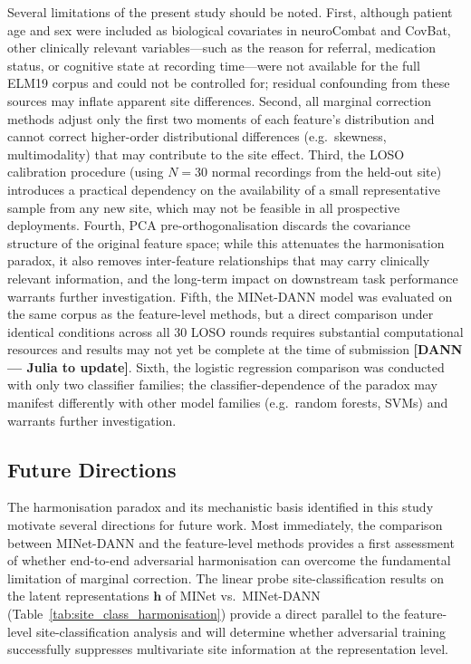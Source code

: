 \documentclass[preprint,12pt]{elsarticle}
\begin{document}
Several limitations of the present study should be noted.
First, although patient age and sex were included as biological
covariates in neuroCombat and CovBat, other clinically relevant
variables---such as the reason for referral, medication status, or
cognitive state at recording time---were not available for the full
ELM19 corpus and could not be controlled for; residual confounding
from these sources may inflate apparent site differences.
Second, all marginal correction methods adjust only the first two
moments of each feature's distribution and cannot correct
higher-order distributional differences (e.g.\ skewness,
multimodality) that may contribute to the site effect.
Third, the LOSO calibration procedure (using $N = 30$ normal
recordings from the held-out site) introduces a practical dependency
on the availability of a small representative sample from any new
site, which may not be feasible in all prospective deployments.
Fourth, PCA pre-orthogonalisation discards the covariance structure
of the original feature space; while this attenuates the harmonisation
paradox, it also removes inter-feature relationships that may carry
clinically relevant information, and the long-term impact on
downstream task performance warrants further investigation.
Fifth, the MINet-DANN model was evaluated on the same corpus as the
feature-level methods, but a direct comparison under identical
conditions across all 30 LOSO rounds requires substantial
computational resources and results may not yet be complete at the
time of submission \textbf{[DANN --- Julia to update]}.
Sixth, the logistic regression comparison was conducted with only two
classifier families; the classifier-dependence of the paradox may
manifest differently with other model families (e.g.\ random forests,
SVMs) and warrants further investigation.

\subsection{Future Directions}
\label{subsec:future}

The harmonisation paradox and its mechanistic basis identified in
this study motivate several directions for future work.
Most immediately, the comparison between MINet-DANN and the
feature-level methods provides a first assessment of whether
end-to-end adversarial harmonisation can overcome the fundamental
limitation of marginal correction.
The linear probe site-classification results on the latent
representations $\mathbf{h}$ of MINet vs.\ MINet-DANN
(Table~\ref{tab:site_class_harmonisation}) provide a direct parallel
to the feature-level site-classification analysis and will determine
whether adversarial training successfully suppresses multivariate
site information at the representation level.
\end{document}
